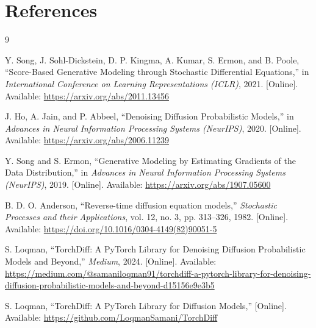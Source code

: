 \documentclass[12pt]{article}
\begin{document}
\section{References}

\begin{thebibliography}{9}

Y. Song, J. Sohl-Dickstein, D. P. Kingma, A. Kumar, S. Ermon, and B. Poole,
``Score-Based Generative Modeling through Stochastic Differential Equations,''
in \emph{International Conference on Learning Representations (ICLR)}, 2021.
[Online]. Available: \url{https://arxiv.org/abs/2011.13456}

\newline

J. Ho, A. Jain, and P. Abbeel,
``Denoising Diffusion Probabilistic Models,''
in \emph{Advances in Neural Information Processing Systems (NeurIPS)}, 2020.
[Online]. Available: \url{https://arxiv.org/abs/2006.11239}

\newline

Y. Song and S. Ermon,
``Generative Modeling by Estimating Gradients of the Data Distribution,''
in \emph{Advances in Neural Information Processing Systems (NeurIPS)}, 2019.
[Online]. Available: \url{https://arxiv.org/abs/1907.05600}

\newline

B. D. O. Anderson,
``Reverse-time diffusion equation models,''
\emph{Stochastic Processes and their Applications}, vol. 12, no. 3, pp. 313--326, 1982.
[Online]. Available: \url{https://doi.org/10.1016/0304-4149(82)90051-5}

\newline


S. Loqman,
``TorchDiff: A PyTorch Library for Denoising Diffusion Probabilistic Models and Beyond,''
\emph{Medium}, 2024.
[Online]. Available: \url{https://medium.com/@samaniloqman91/torchdiff-a-pytorch-library-for-denoising-diffusion-probabilistic-models-and-beyond-d15156e9e3b5}

\newline

S. Loqman,
``TorchDiff: A PyTorch Library for Diffusion Models,''
[Online]. Available: \url{https://github.com/LoqmanSamani/TorchDiff}

\end{thebibliography}
\end{document}
